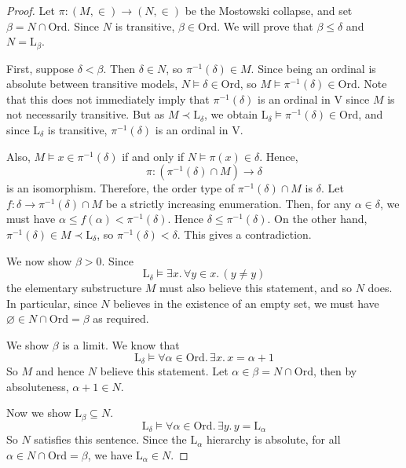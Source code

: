 \begin{proof}
    Let \( \pi : (M, \in) \to (N, \in) \) be the Mostowski collapse, and set \( \beta = N \cap \mathrm{Ord} \).
    Since \( N \) is transitive, \( \beta \in \mathrm{Ord} \).
    We will prove that \( \beta \leq \delta \) and \( N = \mathrm{L}_\beta \).

    First, suppose \( \delta < \beta \).
    Then \( \delta \in N \), so \( \pi^{-1}(\delta) \in M \).
    Since being an ordinal is absolute between transitive models, \( N \vDash \delta \in \mathrm{Ord} \), so \( M \vDash \pi^{-1}(\delta) \in \mathrm{Ord} \).
    Note that this does not immediately imply that \( \pi^{-1}(\delta) \) is an ordinal in \( \mathrm{V} \) since \( M \) is not necessarily transitive.
    But as \( M \prec \mathrm{L}_\delta \), we obtain \( \mathrm{L}_\delta \vDash \pi^{-1}(\delta) \in \mathrm{Ord} \), and since \( \mathrm{L}_\delta \) is transitive, \( \pi^{-1}(\delta) \) is an ordinal in \( \mathrm{V} \).

    Also, \( M \vDash x \in \pi^{-1}(\delta) \) if and only if \( N \vDash \pi(x) \in \delta \).
    Hence,
    \[ \pi : (\pi^{-1}(\delta) \cap M) \to \delta \]
    is an isomorphism.
    Therefore, the order type of \( \pi^{-1}(\delta) \cap M \) is \( \delta \).
    Let \( f : \delta \to \pi^{-1}(\delta) \cap M \) be a strictly increasing enumeration.
    Then, for any \( \alpha \in \delta \), we must have \( \alpha \leq f(\alpha) < \pi^{-1}(\delta) \).
    Hence \( \delta \leq \pi^{-1}(\delta) \).
    On the other hand, \( \pi^{-1}(\delta) \in M \prec \mathrm{L}_\delta \), so \( \pi^{-1}(\delta) < \delta \).
    This gives a contradiction.

    We now show \( \beta > 0 \).
    Since
    \[ \mathrm{L}_\delta \vDash \exists x.\, \forall y \in x.\, (y \neq y) \]
    the elementary substructure \( M \) must also believe this statement, and so \( N \) does.
    In particular, since \( N \) believes in the existence of an empty set, we must have \( \varnothing \in N \cap \mathrm{Ord} = \beta \) as required.

    We show \( \beta \) is a limit.
    We know that
    \[ \mathrm{L}_\delta \vDash \forall \alpha \in \mathrm{Ord}.\, \exists x.\, x = \alpha + 1 \]
    So \( M \) and hence \( N \) believe this statement.
    Let \( \alpha \in \beta = N \cap \mathrm{Ord} \), then by absoluteness, \( \alpha + 1 \in N \).

    Now we show \( \mathrm{L}_\beta \subseteq N \).
    \[ \mathrm{L}_\delta \vDash \forall \alpha \in \mathrm{Ord}.\, \exists y.\, y = \mathrm{L}_\alpha \]
    So \( N \) satisfies this sentence.
    Since the \( \mathrm{L}_\alpha \) hierarchy is absolute, for all \( \alpha \in N \cap \mathrm{Ord} = \beta \), we have \( \mathrm{L}_\alpha \in N \).


\end{proof}
